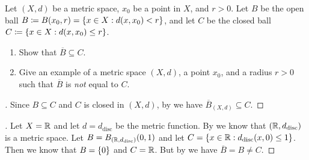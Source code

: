 \begin{ex}\label{ii:ex:1.2.4}
  Let \((X, d)\) be a metric space, \(x_0\) be a point in \(X\), and \(r > 0\).
  Let \(B\) be the open ball \(B \coloneqq B(x_0, r) = \left\lbrace x \in X : d(x, x_0) < r\right\rbrace\), and let \(C\) be the closed ball \(C \coloneqq \left\lbrace x \in X : d(x, x_0) \leq r\right\rbrace\).
  \begin{enumerate}
    \item\label{ii:ex:1.2.4.a} Show that \(\overline{B} \subseteq C\).
    \item\label{ii:ex:1.2.4.b} Give an example of a metric space \((X, d)\), a point \(x_0\), and a radius \(r > 0\) such that \(\overline{B}\) is \emph{not} equal to \(C\).
  \end{enumerate}
\end{ex}

\begin{proof}[]
  Since \(B \subseteq C\) and \(C\) is closed in \((X, d)\), by  we have \(\overline{B}_{(X, d)} \subseteq C\).
\end{proof}

\begin{proof}[]
  Let \(X = \mathbb{R}\) and let \(d = d_{\text{disc}}\) be the metric function.
  By  we know that \((\mathbb{R}, d_{\text{disc}})\) is a metric space.
  Let \(B = B_{(\mathbb{R}, d_{\text{disc}})}(0, 1)\) and let \(C = \left\lbrace x \in \mathbb{R} : d_{\text{disc}}(x, 0) \leq 1\right\rbrace\).
  Then we know that \(B = \left\lbrace0\right\rbrace\) and \(C = \mathbb{R}\).
  But by  we have \(\overline{B} = B \neq C\).
\end{proof}
